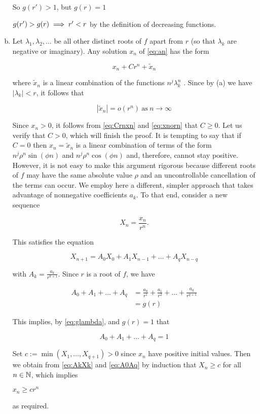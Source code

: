 \begin{theorem}
\begin{pf}
\begin{enumerate}[(a)]
So $g(r')>1$, but $g(r)=1$

\imp $g(r')>g(r)\implies r'<r$ by the definition of decreasing functions.

\item Let $\lambda_1, \lambda_2, \dots$ be all other distinct roots of $f$ apart from $r$ (so that $\lambda_k$ are negative or imaginary). Any solution $x_n$ of \ref{eq:an} has the form

\begin{equation} \label{eq:Crnxn}
x_n + Cr^n +\tilde{x}_n    
\end{equation}

where $\tilde{x}_n$ is a linear combination of the functions $n^j\lambda^n_k$ . Since by (a) we have $|\lambda_k| < r$, it follows that

\begin{equation} \label{eq:xnorn}
|\tilde{x}_n| = o(r^n) \ \text{as} \ n\to\infty    
\end{equation}

Since $x_n > 0$, it follows from \ref{eq:Crnxn} and \ref{eq:xnorn} that $C \geq 0$. Let us verify that $C > 0$, which will finish the proof. It is tempting to say that if $C = 0$ then $x_n = \tilde{x}_n$ is a linear combination of terms of the form $n^j\rho^n \sin(\phi n)$ and $n^j\rho^n \cos(\phi n)$ and, therefore, cannot stay positive. However, it is not easy to make this argument rigorous because different roots of $f$ may have the same absolute value $\rho$ and an uncontrollable cancellation of the terms can occur. We employ here a different, simpler approach that takes advantage of nonnegative coefficients $a_k$. To that end, consider a new sequence

$$ X_n = \frac{x_n}{r^n}.$$

This satisfies the equation

\begin{equation} \label{eq:AkXk}
X_{n+1}=A_0X_0+A_1X_{n-1}+\dots+A_qX_{n-q}
\end{equation}

with $A_k = \frac{a_k}{r^{k+1}}$. Since $r$ is a root of $f$, we have

\begin{align}
  A_0+A_1+\dots+A_q &= \frac{a_0}{r^{1}}+\frac{a_1}{r^{2}}+\dots+\frac{a_q}{r^{q+1}} \nonumber \\ 
                     &= g(r) \nonumber 
\end{align}

This implies, by \ref{eq:glambda}, and $g(r)=1$ that 

\begin{equation}
     A_0+A_1+\dots+A_q = 1 \label{eq:A0Aq}
\end{equation}

Set $c := \min(X_1, \dots , X_{q+1}) > 0$ since $x_n$ have positive initial values. Then we obtain from \ref{eq:AkXk} and \ref{eq:A0Aq} by induction that
$X_n \geq c$ for all $n \in \mathbb N$, which implies

$x_n\geq cr^n$

as required.
\end{enumerate}
\end{pf}
\end{theorem}


